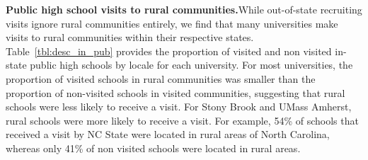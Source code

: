 \documentclass[twoside]{article}
\begin{document}
\textbf{Public high school visits to rural communities.}While out-of-state recruiting visits ignore rural communities entirely, we find that many universities make visits to rural communities within their respective states. Table~\ref{tbl:desc_in_pub} provides the proportion of visited and non visited in-state public high schools by locale for each university. For most universities, the proportion of visited schools in rural communities was smaller than the proportion of non-visited schools in visited communities, suggesting that rural schools were less likely to receive a visit.  For Stony Brook and UMass Amherst, rural schools were more likely to receive a visit. For example, 54\% of schools that received a visit by NC State were located in rural areas of North Carolina, whereas only 41\% of non visited schools were located in rural areas.


\end{document}
